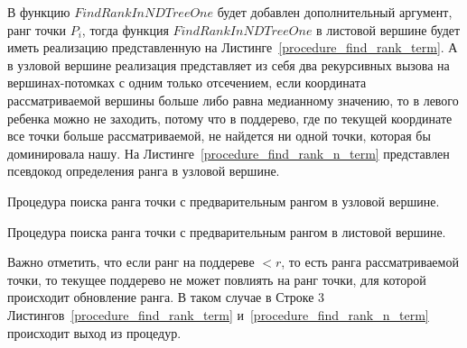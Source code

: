 В функцию $FindRankInNDTreeOne$ будет добавлен дополнительный аргумент, ранг точки $P_i$, тогда функция $FindRankInNDTreeOne$ в листовой вершине будет иметь реализацию представленную на Листинге~\ref{procedure_find_rank_term}. А в узловой вершине реализация представляет из себя два рекурсивных вызова на вершинах-потомках с одним только отсечением, если координата рассматриваемой вершины больше либо равна медианному значению, то в левого ребенка можно не заходить, потому что в поддерево, где по текущей координате все точки больше рассматриваемой, не найдется ни одной точки, которая бы доминировала нашу. На Листинге~\ref{procedure_find_rank_n_term} представлен псевдокод определения ранга в узловой вершине.

\begin{algorithm}
\begin{algorithmic}[1]
    \EndIf

    \EndIf
    
\EndProcedure
\end{algorithmic}
\caption{Процедура поиска ранга точки с предварительным рангом в узловой вершине.}
\label{procedure_find_rank_n_term}
\end{algorithm}

\begin{algorithm}
\begin{algorithmic}[1]
    \EndIf
        \EndIf
    \EndFor
\EndProcedure
\end{algorithmic}
\caption{Процедура поиска ранга точки с предварительным рангом в листовой вершине.}
\label{procedure_find_rank_term}
\end{algorithm}

Важно отметить, что если ранг на поддереве $< r$, то есть ранга рассматриваемой точки, то текущее поддерево не может повлиять на ранг точки, для которой происходит обновление ранга. В таком случае в Строке 3 Листингов~\ref{procedure_find_rank_term} и~\ref{procedure_find_rank_n_term} происходит выход из процедур.





